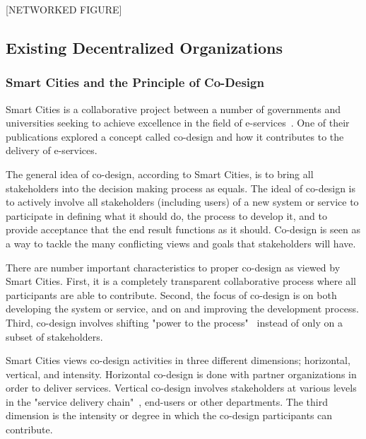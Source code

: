 [NETWORKED FIGURE]

\subsection{Existing Decentralized Organizations}

\subsubsection{Smart Cities and the Principle of Co-Design}

Smart Cities is a collaborative project between a number of governments and universities seeking to achieve excellence in the field of e-services~\cite{Cities}. One of their publications explored a concept called co-design and how it contributes to the delivery of e-services. 


The general idea of co-design, according to Smart Cities, is to bring all stakeholders into the decision making process as equals. The ideal of co-design is to actively involve all stakeholders (including users) of a new system or service to participate in defining what it should do, the process to develop it, and to provide acceptance that the end result functions as it should. Co-design is seen as a way to tackle the many conflicting views and goals that stakeholders will have. 

There are number important characteristics to proper co-design as viewed by Smart Cities. First, it is a completely transparent collaborative process where all participants are able to contribute. Second, the focus of co-design is on both developing the system or service, and on and improving the development process. Third, co-design involves shifting "power to the process"~\cite{Cities} instead of only on a subset of stakeholders.

Smart Cities views co-design activities in three different dimensions; horizontal, vertical, and intensity. Horizontal co-design is done with partner organizations in order to deliver services. Vertical co-design involves stakeholders at various levels in the "service delivery chain"~\cite{Cities}, end-users or other departments. The third dimension is the intensity or degree in which the co-design participants can contribute. 



